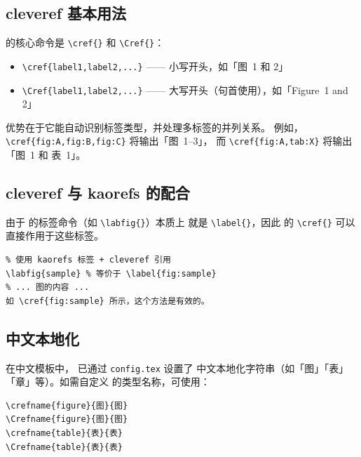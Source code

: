 \subsection{cleveref 基本用法}


 的核心命令是 \lstinline|\cref{}| 和 \lstinline|\Cref{}|：

\begin{itemize}
    \item \lstinline|\cref{label1,label2,...}| —— 小写开头，如「图~1 和 2」
    \item \lstinline|\Cref{label1,label2,...}| —— 大写开头（句首使用），如「Figure~1 and 2」
\end{itemize}


 优势在于它能自动识别标签类型，并处理多标签的并列关系。
例如，\lstinline|\cref{fig:A,fig:B,fig:C}| 将输出「图~1--3」，
而 \lstinline|\cref{fig:A,tab:X}| 将输出「图~1 和 表~1」。

\subsection{cleveref 与 kaorefs 的配合}

由于  的标签命令（如 \lstinline|\labfig{}|）本质上
就是 \lstinline|\label{}|，因此  的 \lstinline|\cref{}|
可以直接作用于这些标签。

\begin{lstlisting}
% 使用 kaorefs 标签 + cleveref 引用
\labfig{sample} % 等价于 \label{fig:sample}
% ... 图的内容 ...
如 \cref{fig:sample} 所示，这个方法是有效的。
\end{lstlisting}

\subsection{中文本地化}

在中文模板中， 已通过 \lstinline|config.tex| 设置了
中文本地化字符串（如「图」「表」「章」等）。如需自定义 
的类型名称，可使用：

\begin{lstlisting}
\crefname{figure}{图}{图}
\Crefname{figure}{图}{图}
\crefname{table}{表}{表}
\Crefname{table}{表}{表}
\end{lstlisting}

